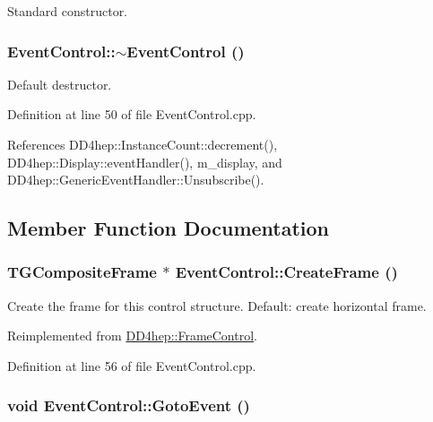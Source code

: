 Standard constructor. \hypertarget{class_d_d4hep_1_1_event_control_ad8fcc15169bd6829ac92497adf216b94}{
\subsubsection[{$\sim$EventControl}]{\setlength{\rightskip}{0pt plus 5cm}EventControl::$\sim$EventControl ()}}
\label{class_d_d4hep_1_1_event_control_ad8fcc15169bd6829ac92497adf216b94}


Default destructor. 

Definition at line 50 of file EventControl.cpp.

References DD4hep::InstanceCount::decrement(), DD4hep::Display::eventHandler(), m\_\-display, and DD4hep::GenericEventHandler::Unsubscribe().

\subsection{Member Function Documentation}
\hypertarget{class_d_d4hep_1_1_event_control_a10479ca8f5f5836f6e3a9c1367eea1fb}{
\subsubsection[{CreateFrame}]{\setlength{\rightskip}{0pt plus 5cm}TGCompositeFrame $\ast$ EventControl::CreateFrame ()}}
\label{class_d_d4hep_1_1_event_control_a10479ca8f5f5836f6e3a9c1367eea1fb}


Create the frame for this control structure. Default: create horizontal frame. 

Reimplemented from \hyperlink{class_d_d4hep_1_1_frame_control_a3622593e0da13ddc3719d845782ec7be}{DD4hep::FrameControl}.

Definition at line 56 of file EventControl.cpp.\hypertarget{class_d_d4hep_1_1_event_control_a4804b629feb785168b1ddb18592587bb}{
\subsubsection[{GotoEvent}]{\setlength{\rightskip}{0pt plus 5cm}void EventControl::GotoEvent ()}}
\label{class_d_d4hep_1_1_event_control_a4804b629feb785168b1ddb18592587bb}


